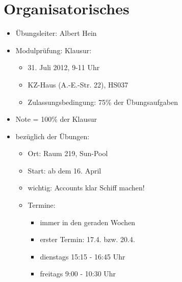 \documentclass[%
a4paper, %
9pt,               %
leqno,              %
fleqn,              %
]
{scrartcl}
\begin{document}
\section*{Organisatorisches}
\begin{itemize}
\item Übungsleiter: Albert Hein
\item Modulprüfung: Klausur:
  \begin{itemize}
    \item 31. Juli 2012, 9-11 Uhr
    \item KZ-Haus (A.-E.-Str. 22), HS037
    \item Zulassungsbedingung: 75\% der Übungsaufgaben
  \end{itemize}
\item Note = 100\% der Klausur
\item bezüglich der Übungen:
  \begin{itemize}
    \item Ort: Raum 219, Sun-Pool
    \item Start: ab dem 16. April
    \item wichtig: Accounts klar Schiff machen!
    \item Termine:
      \begin{itemize}
        \item immer in den geraden Wochen
        \item erster Termin: 17.4. bzw. 20.4.
        \item dienstags 15:15 - 16:45 Uhr
        \item freitags 9:00 - 10:30 Uhr
      \end{itemize}
  \end{itemize}
\end{itemize}
\end{document}

